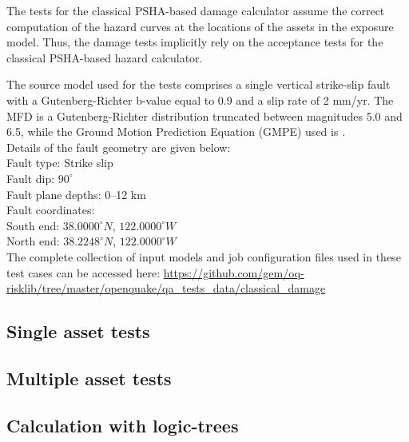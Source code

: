 The tests for the classical PSHA-based damage calculator assume the correct computation of the hazard curves at the locations of the assets in the exposure model. Thus, the damage tests implicitly rely on the acceptance tests for the classical PSHA-based hazard calculator.

The source model used for the tests comprises a single vertical strike-slip fault with a Gutenberg-Richter b-value equal to 0.9 and a slip rate of 2 mm/yr. The MFD is a Gutenberg-Richter distribution truncated between magnitudes 5.0 and 6.5, while the Ground Motion Prediction Equation (GMPE) used is \citet{boore2008}.\\

\noindent Details of the fault geometry are given below:\\

\noindent
Fault type: Strike slip\\
Fault dip: $90^{\circ}$\\
Fault plane depths: 0--12 km\\
Fault coordinates:\\
South end: $38.0000^{\circ} N$, $122.0000^{\circ} W$\\
North end: $38.2248^{\circ} N$, $122.0000^{\circ} W$\\

The complete collection of input models and job configuration files used in these test cases can be accessed here:
\href{https://github.com/gem/oq-risklib/tree/master/openquake/qa_tests_data/classical_damage}
{https://github.com/gem/oq-risklib/tree/master/openquake/qa\_tests\_data/classical\_damage}

\subsection{Single asset tests}
\label{subsec:cd-single}


\subsection{Multiple asset tests}
\label{subsec:cd-multiple}


\subsection{Calculation with logic-trees}
\label{subsec:cd-lt}
